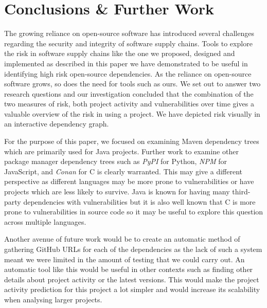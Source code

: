 \documentclass[conference]{IEEEtran}
\begin{document}
\section{Conclusions \& Further Work}
The growing reliance on open-source software \cite{noauthor_cisa_2023} has introduced several challenges regarding the security and integrity of software supply chains. Tools to explore the risk in software supply chains like the one we proposed, designed and implemented as described in this paper we have demonstrated to be useful in identifying high risk open-source dependencies. As the reliance on open-source software grows, so does the need for tools such as ours. We set out to answer two research questions and our investigation concluded that the combination of the two measures of risk, both project activity and vulnerabilities over time gives a valuable overview of the risk in using a project. We have depicted risk visually in an interactive dependency graph. 

For the purpose of this paper, we focused on examining Maven dependency trees which are primarily used for Java projects. Further work to examine other package manager dependency trees such as \textit{PyPI} for Python, \textit{NPM} for JavaScript, and \textit{Conan} for C is clearly warranted. This may give a different perspective as different languages may be more prone to vulnerabilities or have projects which are less likely to survive. Java is known for having many third-party dependencies with vulnerabilities but it is also well known that C is more prone to vulnerabilities in source code so it may be useful to explore this question across multiple languages. 

Another avenue of future work would be to create an automatic method of gathering GitHub URLs for each of the dependencies as the lack of such a system meant we were limited in the amount of testing that we could carry out. An automatic tool like this would be useful in other contexts such as finding other details about project activity or the latest versions. This would make the project activity prediction for this project a lot simpler and would increase its scalability when analysing larger projects. 
\end{document}

